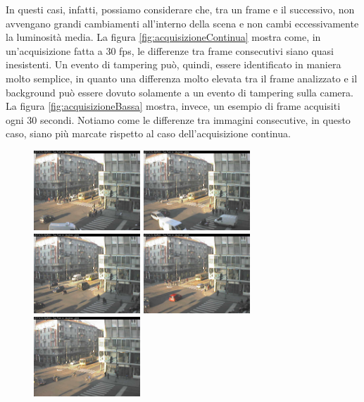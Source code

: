 In questi casi, infatti, possiamo considerare che, tra un frame e il successivo, non avvengano grandi cambiamenti all'interno della scena e non cambi eccessivamente la luminosit\`a media.
La figura \ref{fig:acquisizioneContinua} mostra come, in un'acquisizione fatta a 30 fps, le differenze tra frame consecutivi siano quasi inesistenti. 
Un evento di tampering pu\`o, quindi, essere identificato in maniera molto semplice, in quanto una differenza molto elevata tra il frame analizzato e il background pu\`o essere dovuto solamente a un evento di tampering sulla camera.
La figura \ref{fig:acquisizioneBassa} mostra, invece, un esempio di frame acquisiti ogni 30 secondi.
Notiamo come le differenze tra immagini consecutive, in questo caso, siano pi\`u marcate rispetto al caso dell'acquisizione continua. 
\begin{figure}
	\centering
	\includegraphics[width = 4cm]{./pictures/FPSbasso/image2691}
	\includegraphics[width = 4cm]{./pictures/FPSbasso/image2692}
	\includegraphics[width = 4cm]{./pictures/FPSbasso/image2693}
	\includegraphics[width = 4cm]{./pictures/FPSbasso/image2694}
	\includegraphics[width = 4cm]{./pictures/FPSbasso/image2695}

\end{figure}
